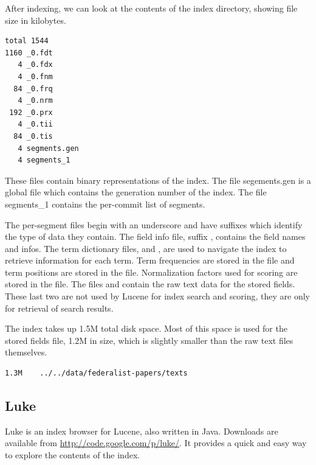 After indexing, we can look at the contents of the index directory,
showing file size in kilobytes.
%
\begin{verbatim}
total 1544
1160 _0.fdt
   4 _0.fdx
   4 _0.fnm
  84 _0.frq
   4 _0.nrm
 192 _0.prx
   4 _0.tii
  84 _0.tis
   4 segments.gen
   4 segments_1
\end{verbatim}

%
These files contain binary representations of the index.  
The file segements.gen is a global file which contains the generation number of the index.
The file segments\_1 contains the per-commit list of segments.

The per-segment files begin with an underscore and have suffixes
which identify the type of data they contain.
The field info file, suffix , contains the field names and infos.
The term dictionary files,  and , are used to navigate the index to
retrieve information for each term.
Term frequencies are stored in the  file
and term positions are stored in the  file.
Normalization factors used for scoring are stored in the  file.
The files  and  contain the raw text data for the stored fields.
These last two are not used by Lucene for index search and scoring, they are only
for retrieval of search results.

The index takes up 1.5M total disk space.
Most of this space is used for the stored fields file, 1.2M in size,
which is slightly smaller than the raw text files themselves.
\begin{verbatim}
1.3M	../../data/federalist-papers/texts
\end{verbatim}

\subsection{Luke}

Luke is an index browser for Lucene, also written in Java.
Downloads are available from \url{http://code.google.com/p/luke/}.
It provides a quick and easy way to explore the contents of the index.

